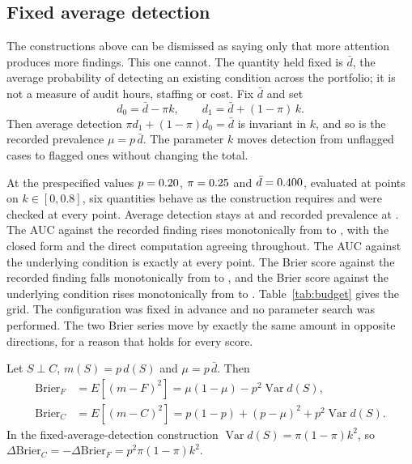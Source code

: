 \subsection{Fixed average detection}

The constructions above can be dismissed as saying only that more attention
produces more findings. This one cannot. The quantity held fixed is $\bar d$,
the average probability of detecting an existing condition across the
portfolio; it is not a measure of audit hours, staffing or cost. Fix $\bar d$
and set
%
\[
  d_0 = \bar d - \pi k, \qquad d_1 = \bar d + (1-\pi)\,k .
\]
%
Then average detection $\pi d_1 + (1-\pi) d_0 = \bar d$ is invariant in $k$, and
so is the recorded prevalence $\mu = p\,\bar d$. The parameter $k$ moves
detection from unflagged cases to flagged ones without changing the total.

At the prespecified values $p = 0.20{}$, $\pi = 0.25{}$ and
$\bar d = 0.400{}$, evaluated at \nBudgetPoints{} points on
$k \in [0, 0.8]$, six quantities behave as the construction requires and were
checked at every point. Average detection stays at \nBudgetDetection{} and
recorded prevalence at \nBudgetPrevalence{}. The AUC against the recorded
finding rises monotonically from \nBudgetAucFstart{} to \nBudgetAucFend{}, with
the closed form and the direct computation agreeing throughout. The AUC
against the underlying condition is exactly \nBudgetAucC{} at every point. The
Brier score against the recorded finding falls monotonically from
\nBudgetBrierFstart{} to \nBudgetBrierFend{}, and the Brier score against the
underlying condition rises monotonically from \nBudgetBrierCstart{} to
\nBudgetBrierCend{}. Table~\ref{tab:budget} gives the grid. The configuration
was fixed in advance and no parameter search was performed. The two Brier
series move by exactly the same amount in opposite directions, for a reason
that holds for every score.

\begin{proposition}\label{prop:brier}
Let $S \perp C$, $m(S) = p\,d(S)$ and $\mu = p\,\bar d$. Then
%
\begin{align*}
  \mathrm{Brier}_F &= E[(m - F)^2] = \mu(1-\mu) - p^2 \operatorname{Var} d(S), \\
  \mathrm{Brier}_C &= E[(m - C)^2] = p(1-p) + (p - \mu)^2 + p^2 \operatorname{Var} d(S).
\end{align*}
%
In the fixed-average-detection construction $\operatorname{Var} d(S) =
\pi(1-\pi)k^2$, so $\Delta\mathrm{Brier}_C = -\Delta\mathrm{Brier}_F =
p^2\pi(1-\pi)k^2$.
\end{proposition}

